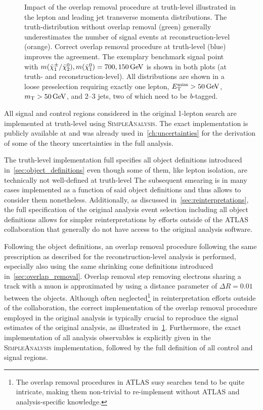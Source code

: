 \begin{figure}
	\caption{Impact of the overlap removal procedure at truth-level illustrated in the lepton and leading jet transverse momenta distributions. The truth-distribution without overlap removal (green) generally underestimates the number of signal events at reconstruction-level (orange). Correct overlap removal procedure at truth-level (blue) improves the agreement. The exemplary benchmark signal point with $m(\charg/\neutr), m(\lsp) = 700, \SI{150}{\GeV}$ is shown in both plots (at truth- and reconstruction-level). All distributions are shown in a loose preselection requiring exactly one lepton, $\met>\SI{50}{\GeV}$, $\mt > \SI{50}{\GeV}$, and 2--3 jets, two of which need to be \textit{b}-tagged.}
	\label{fig:overlap_removal_truth}
\end{figure}

All signal and control regions considered in the original 1-lepton search are implemented at truth-level using \textsc{SimpleAnalysis}. The exact implementation is publicly available at \cite{HEPdata_1Lbb} and was already used in~\cref{ch:uncertainties} for the derivation of some of the theory uncertainties in the full analysis.

The truth-level implementation full specifies all object definitions introduced in~\cref{sec:object_definitions} even though some of them, like \eg lepton isolation, are technically not well-defined at truth-level The subsequent smearing is in many cases implemented as a function of said object definitions and thus allows to consider them nonetheless. Additionally, as discussed in~\cref{sec:reinterpretations}, the full specification of the original analysis event selection including all object definitions allows for simpler reinterpretations by efforts outside of the ATLAS collaboration that generally do not have access to the original analysis software.

Following the object definitions, an overlap removal procedure following the same prescription as described for the reconstruction-level analysis is performed, \ie especially also using the same shrinking cone definitions introduced in~\cref{sec:overlap_removal}. Overlap removal step removing electrons sharing a track with a muon is approximated by using a distance parameter of $\Delta R = 0.01$ between the objects. Although often neglected\footnote{The overlap removal procedures in ATLAS \gls{susy} searches tend to be quite intricate, making them non-trivial to re-implement without ATLAS and analysis-specific knowledge.} in reinterpretation efforts outside of the collaboration, the correct implementation of the overlap removal procedure employed in the original analysis is typically crucial to reproduce the signal estimates of the original analysis, as illustrated in~\cref{fig:overlap_removal_truth}. Furthermore, the exact implementation of all analysis observables is explicitly given in the \textsc{SimpleAnalysis} implementation, followed by the full definition of all control and signal regions.

